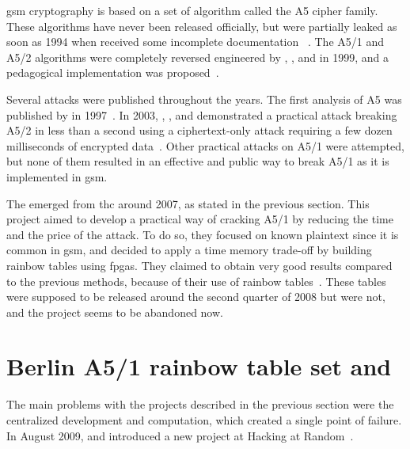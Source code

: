 {{      \gls{gsm} cryptography is based on a set of algorithm called the
      A5 cipher family. These algorithms have never been released
      officially, but were partially leaked as soon as 1994 when
       received some incomplete documentation
      ~\cite{anderson_a5_1994}. The A5/1 and A5/2 algorithms
      were completely reversed engineered by ,
      , and  in 1999, and a
      pedagogical implementation was
      proposed~\cite{briceno_pedagogical_1999}.

      Several attacks were published throughout the years. The first
      analysis of A5 was published by  in
      1997~\cite{golic_cryptanalysis_1997}. In 2003, ,
      , and  demonstrated a
      practical attack breaking A5/2 in less than a second using a
      ciphertext-only attack requiring a few dozen milliseconds of
      encrypted data~\cite{barkan_instant_2003}. Other practical attacks
      on A5/1 were attempted, but none of them resulted in an effective
      and public way to break A5/1 as it is implemented in \gls{gsm}.

      The  emerged from \gls{thc} around 2007,
      as stated in the previous section. This project aimed to develop a
      practical way of cracking A5/1 by reducing the time and the price
      of the attack. To do so, they focused on known plaintext since it
      is common in \gls{gsm}, and decided to apply a time memory
      trade-off by building rainbow tables using \glspl{fpga}. They
      claimed to obtain very good results compared to the previous
      methods, because of their use of rainbow
      tables~\cite{hulton_intercepting_2008}. These tables were supposed
      to be released around the second quarter of 2008 but were not, and
      the project seems to be abandoned now.

    \section{Berlin A5/1 rainbow table set and }
    \label{sec:berlin}

      The main problems with the projects described in the previous
      section were the centralized development and computation, which
      created a single point of failure. In August 2009,  and  introduced a new project at
      Hacking at Random~\cite{nohl_subverting_2009}.
      
}}
